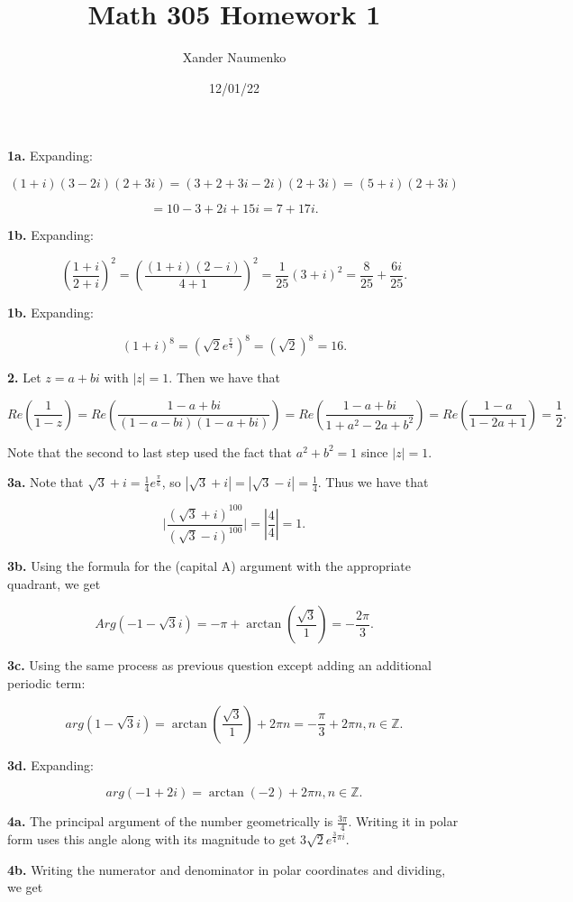 \documentclass[letterpaper, reqno,11pt]{article}
\newcommand{\ZZ}{\mathbb{Z}}
\begin{document}
\title{Math 305 Homework 1}
\date{12/01/22}
\author{Xander Naumenko}
\maketitle

{\noindent\bf 1a.} Expanding:

\[
    (1+i)(3-2i)(2+3i)=(3+2+3i-2i)(2+3i)=(5+i)(2+3i)
\] 

\[
    =10-3+2i+15i=7+17i
.\] 

{\noindent\bf 1b.} Expanding: 

\[
    (\frac{1+i}{2+i})^2=(\frac{(1+i)(2-i)}{4+1})^2=\frac{1}{25}(3+i)^2=\frac{8}{25}+\frac{6i}{25}
.\] 


{\noindent\bf 1b.} Expanding: 

\[
    (1+i)^8=(\sqrt{2} e^\frac{\pi}{4})^8=(\sqrt{2} )^8=16
.\] 

{\noindent\bf 2.} Let $z=a+bi$ with $|z|=1$. Then we have that 

\[
Re(\frac{1}{1-z})=Re(\frac{1-a+bi}{(1-a-bi)(1-a+bi)})=Re(\frac{1-a+bi}{1+a^2-2a+b^2})=Re(\frac{1-a}{1-2a+1})=\frac{1}{2}
.\] 

Note that the second to last step used the fact that $a^2+b^2=1$ since $|z|=1$. 

{\noindent\bf 3a.} Note that $ \sqrt{3} +i=\frac{1}{4}e^{\frac{\pi}{6}}$, so $|\sqrt{3} +i|=|\sqrt{3} -i|=\frac{1}{4}$. Thus we have that 

\[
\bigg|\frac{(\sqrt{3}+i)^{100}}{(\sqrt{3}-i)^{100}}\bigg|=|\frac{4}{4}|=1
.\] 

{\noindent\bf 3b.} Using the formula for the (capital A) argument with the appropriate quadrant, we get 

\[
Arg(-1-\sqrt{3} i)=-\pi+\arctan(\frac{\sqrt{3} }{1})=-\frac{2\pi}{3}
.\] 

{\noindent\bf 3c.} Using the same process as previous question except adding an additional periodic term: 

\[
arg(1-\sqrt{3} i)=\arctan(\frac{\sqrt{3} }{1})+2\pi n=-\frac{\pi}{3}+ 2\pi n, n\in\ZZ
.\] 

{\noindent\bf 3d.} Expanding:

\[
arg(-1+2i)=\arctan(-2)+2\pi n, n\in\ZZ
.\] 

{\noindent\bf 4a.} The principal argument of the number geometrically is $\frac{3\pi}{4}$. Writing it in polar form uses this angle along with its magnitude to get $3\sqrt{2}e^{\frac{3}{4}\pi i}$. 

{\noindent\bf 4b.} Writing the numerator and denominator in polar coordinates and dividing, we get 
\end{document}
